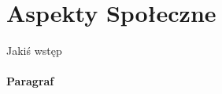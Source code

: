 

\section{Aspekty Społeczne}
\label{subsec:aspekty-spoleczne}



Jakiś wstęp

\paragraph{Paragraf}



